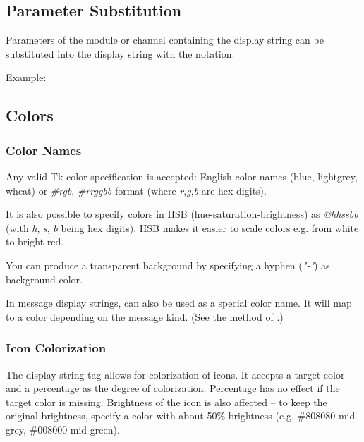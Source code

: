 

\subsection{Parameter Substitution}

Parameters of the module or channel containing the
display string can be substituted into the display string
with the  notation:

Example:


\subsection{Colors}
\label{sec:ch-graphics:colors}

\subsubsection{Color Names}

Any valid Tk color specification is accepted: English color names
(blue, lightgrey, wheat) or \textit{\#rgb}, \textit{\#rrggbb} format
(where \textit{r},\textit{g},\textit{b} are hex digits).

It is also possible to specify colors in HSB (hue-saturation-brightness) as
\textit{@hhssbb} (with \textit{h}, \textit{s}, \textit{b} being hex digits).
HSB makes it easier to scale colors e.g. from white to bright red.

You can produce a transparent background by specifying a hyphen (\textit{"-"})
as background color.

In message display strings,  can also be used as a special color name.
It will map to a color depending on the message kind.
(See the  method of .)

\subsubsection{Icon Colorization}

The  display string tag allows for colorization of icons.
It accepts a target color and a percentage as the degree of colorization.
Percentage has no effect if the target color is missing.
Brightness of the icon is also affected -- to keep the original brightness,
specify a color with about 50\% brightness (e.g. \#808080 mid-grey,
\#008000 mid-green).

